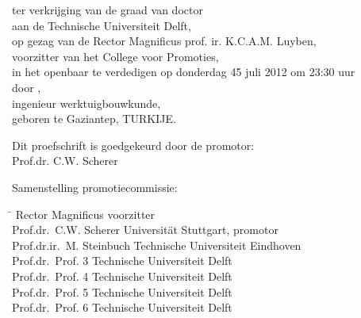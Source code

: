 \smallskip{}


\begin{center}
ter verkrijging van de graad van doctor\\
aan de Technische Universiteit Delft,\\
op gezag van de Rector Magnificus prof. ir. K.C.A.M. Luyben,\\
voorzitter van het College voor Promoties,\\
in het openbaar te verdedigen op donderdag 45 juli 2012 om 23:30 uur\\
door \theauthor,\\
ingenieur werktuigbouwkunde,\\
geboren te Gaziantep, TURKIJE.
\end{center}

\newpage %
\thispagestyle{empty}

\noindent Dit proefschrift is goedgekeurd door de promotor:\\
Prof.dr. C.W. Scherer\\
\bigskip{}

\noindent Samenstelling promotiecommissie:
\smallskip{}
\noindent
\begin{flushleft}\begin{tabbing}
\hspace*{50mm}\=\kill
Rector Magnificus \> voorzitter\\
Prof.dr.\ C.W. Scherer     \> Universit\"{a}t Stuttgart, promotor\\
Prof.dr.ir.\ M. Steinbuch  \> Technische Universiteit Eindhoven\\
Prof.dr.\ Prof. 3 \> Technische Universiteit Delft\\
Prof.dr.\ Prof. 4 \> Technische Universiteit Delft\\
Prof.dr.\ Prof. 5 \> Technische Universiteit Delft\\
Prof.dr.\ Prof. 6 \> Technische Universiteit Delft\\
\end{tabbing}\end{flushleft}
\smallskip

